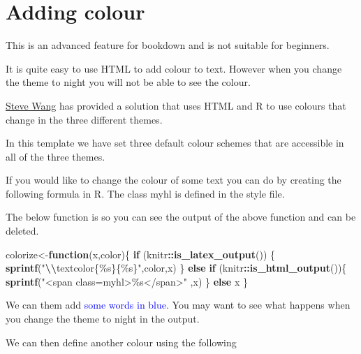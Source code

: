 \documentclass[
]{article}
\newenvironment{Shaded}{\begin{snugshade}}{\end{snugshade}}
\newcommand{\ControlFlowTok}[1]{\textcolor[rgb]{0.13,0.29,0.53}{\textbf{#1}}}
\newcommand{\FunctionTok}[1]{\textcolor[rgb]{0.13,0.29,0.53}{\textbf{#1}}}
\newcommand{\NormalTok}[1]{#1}
\newcommand{\OtherTok}[1]{\textcolor[rgb]{0.56,0.35,0.01}{#1}}
\newcommand{\SpecialCharTok}[1]{\textcolor[rgb]{0.81,0.36,0.00}{\textbf{#1}}}
\newcommand{\StringTok}[1]{\textcolor[rgb]{0.31,0.60,0.02}{#1}}
\numberwithin{equation}{section}
\numberwithin{figure}{section}
\theoremstyle{break}
\theoremstyle{definition}
\theoremstyle{definition}
\theoremstyle{definition}
\theoremstyle{definition}
\theoremstyle{remark}
\begin{document}
\hypertarget{adding-colour}{%
\section{Adding colour}\label{adding-colour}}

This is an advanced feature for bookdown and is not suitable for beginners.

It is quite easy to use HTML to add {colour to text.} However when you change the theme to night you will not be able to see the colour.

\href{https://www.nottingham.ac.uk/biosciences/people/qingqi.wang}{Steve Wang} has provided a solution that uses HTML and R to use colours that change in the three different themes.

In this template we have set three default colour schemes that are accessible in all of the three themes.

If you would like to change the colour of some text you can do by creating the following formula in R. The class myhl is defined in the style file.

The below function is so you can see the output of the above function and can be deleted.

\begin{Shaded}
\begin{Highlighting}[]
\NormalTok{colorize}\OtherTok{\textless{}{-}}\ControlFlowTok{function}\NormalTok{(x,color)\{}
  \ControlFlowTok{if}\NormalTok{ (knitr}\SpecialCharTok{::}\FunctionTok{is\_latex\_output}\NormalTok{()) \{}
    \FunctionTok{sprintf}\NormalTok{(}\StringTok{"}\SpecialCharTok{\textbackslash{}\textbackslash{}}\StringTok{textcolor\{\%s\}\{\%s\}"}\NormalTok{,color,x)}
\NormalTok{  \} }\ControlFlowTok{else} \ControlFlowTok{if}\NormalTok{ (knitr}\SpecialCharTok{::}\FunctionTok{is\_html\_output}\NormalTok{())\{}
    \FunctionTok{sprintf}\NormalTok{(}\StringTok{"\textless{}span class=\textquotesingle{}myhl\textquotesingle{}\textgreater{}\%s\textless{}/span\textgreater{}"}\NormalTok{ ,x)}
\NormalTok{  \} }\ControlFlowTok{else}\NormalTok{ x}
\NormalTok{\}}
\end{Highlighting}
\end{Shaded}

We can them add \textcolor{blue}{some words in blue.} You may want to see what happens when you change the theme to night in the output.

We can then define another colour using the following
\end{document}
